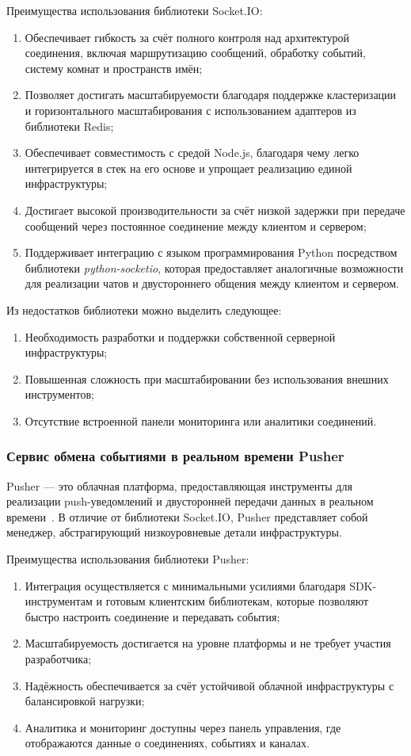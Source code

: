 Преимущества использования библиотеки Socket.IO:
\begin{enumerate}
  \item Обеспечивает гибкость за счёт полного контроля над архитектурой соединения, включая маршрутизацию сообщений, обработку событий, систему комнат и пространств имён;
  \item Позволяет достигать масштабируемости благодаря поддержке кластеризации и горизонтального масштабирования с использованием адаптеров из библиотеки Redis;
  \item Обеспечивает совместимость с средой Node.js, благодаря чему легко интегрируется в стек на его основе и упрощает реализацию единой инфраструктуры;
  \item Достигает высокой производительности за счёт низкой задержки при передаче сообщений через постоянное соединение между клиентом и сервером;
  \item Поддерживает интеграцию с языком программирования Python посредством библиотеки \textit{python-socketio}, которая предоставляет аналогичные возможности для реализации чатов и двустороннего общения между клиентом и сервером.
\end{enumerate}


Из недостатков библиотеки можно выделить следующее:
\begin{enumerate}
  \item Необходимость разработки и поддержки собственной серверной инфраструктуры;
  \item Повышенная сложность при масштабировании без использования внешних инструментов;
  \item Отсутствие встроенной панели мониторинга или аналитики соединений.
\end{enumerate}

\subsubsection*{Сервис обмена событиями в реальном времени Pusher}

Pusher — это облачная платформа, предоставляющая инструменты для реализации push-уведомлений и двусторонней передачи данных в реальном времени~\cite{pusher_docs}. В отличие от библиотеки Socket.IO, Pusher представляет собой менеджер, абстрагирующий низкоуровневые детали инфраструктуры.

Преимущества использования библиотеки Pusher:
\begin{enumerate}
  \item Интеграция осуществляется с минимальными усилиями благодаря SDK-инструментам и готовым клиентским библиотекам, которые позволяют быстро настроить соединение и передавать события;
  \item Масштабируемость достигается на уровне платформы и не требует участия разработчика;
  \item Надёжность обеспечивается за счёт устойчивой облачной инфраструктуры с балансировкой нагрузки;
  \item Аналитика и мониторинг доступны через панель управления, где отображаются данные о соединениях, событиях и каналах.
\end{enumerate}

